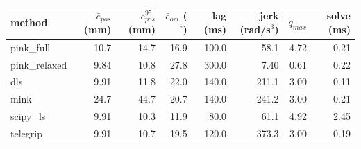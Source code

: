 \begin{tabular}{lrrrrrrr}
\toprule
method & $\bar{e}_{pos}$ (mm) & $e_{pos}^{95}$ (mm) & $\bar{e}_{ori}$ ($^\circ$) & lag (ms) & jerk (rad/s$^3$) & $\dot{q}_{max}$ & solve (ms) \\
\midrule
pink\_full & 10.7 & 14.7 & 16.9 & 100.0 & 58.1 & 4.72 & 0.21 \\
pink\_relaxed & 9.84 & 10.8 & 27.8 & 300.0 & 7.40 & 0.61 & 0.22 \\
dls & 9.91 & 11.8 & 22.0 & 140.0 & 211.1 & 3.00 & 0.11 \\
mink & 24.7 & 44.7 & 20.7 & 140.0 & 241.2 & 3.00 & 0.21 \\
scipy\_ls & 9.91 & 10.3 & 11.9 & 80.0 & 61.1 & 4.92 & 2.45 \\
telegrip & 9.91 & 10.7 & 19.5 & 120.0 & 373.3 & 3.00 & 0.19 \\
\bottomrule
\end{tabular}
